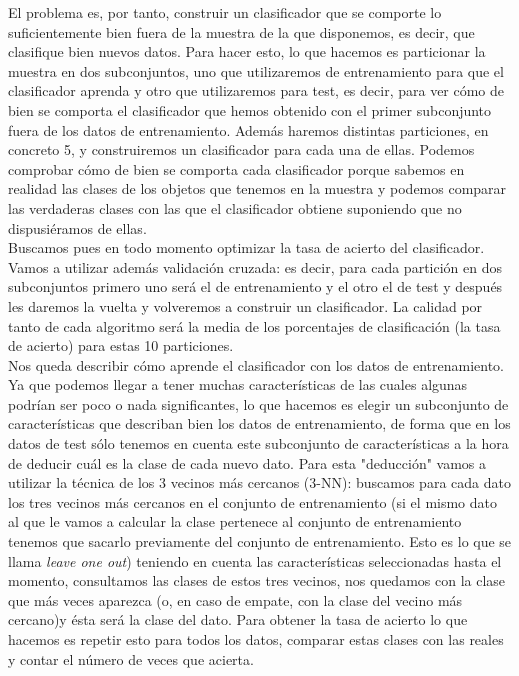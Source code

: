 \documentclass[12pt]{article}
\begin{document}
El problema es, por tanto, construir un clasificador que se comporte lo suficientemente bien fuera de la muestra de la que disponemos, es decir, que clasifique bien nuevos datos. Para hacer esto, lo que hacemos es particionar la muestra en dos subconjuntos, uno que utilizaremos de entrenamiento para que el clasificador aprenda y otro que utilizaremos para test, es decir, para ver cómo de bien se comporta el clasificador que hemos obtenido con el primer subconjunto fuera de los datos de entrenamiento. Además haremos distintas particiones, en concreto 5, y construiremos un clasificador para cada una de ellas. Podemos comprobar cómo de bien se comporta cada clasificador porque sabemos en realidad las clases de los objetos que tenemos en la muestra y podemos comparar las verdaderas clases con las que el clasificador obtiene suponiendo que no dispusiéramos de ellas.\\
Buscamos pues en todo momento optimizar la tasa de acierto del clasificador.\\
Vamos a utilizar además validación cruzada: es decir, para cada partición en dos subconjuntos primero uno será el de entrenamiento y el otro el de test y después les daremos la vuelta y volveremos a construir un clasificador. La calidad por tanto de cada algoritmo será la media de los porcentajes de clasificación (la tasa de acierto) para estas 10 particiones.\\

Nos queda describir cómo aprende el clasificador con los datos de entrenamiento. Ya que podemos llegar a tener muchas características de las cuales algunas podrían ser poco o nada significantes, lo que hacemos es elegir un subconjunto de características que describan bien los datos de entrenamiento, de forma que en los datos de test sólo tenemos en cuenta este subconjunto de características a la hora de deducir cuál es la clase de cada nuevo dato. Para esta "deducción" vamos a utilizar la técnica de los 3 vecinos más cercanos (3-NN): buscamos para cada dato los tres vecinos más cercanos en el conjunto de entrenamiento (si el mismo dato al que le vamos a calcular la clase pertenece al conjunto de entrenamiento tenemos que sacarlo previamente del conjunto de entrenamiento. Esto es lo que se llama \textit{leave one out}) teniendo en cuenta las características seleccionadas hasta el momento, consultamos las clases de estos tres vecinos, nos quedamos con la clase que más veces aparezca (o, en caso de empate, con la clase del vecino más cercano)y ésta será la clase del dato. Para obtener la tasa de acierto lo que hacemos es repetir esto para todos los datos, comparar estas clases con las reales y contar el número de veces que acierta.\\
\end{document}
